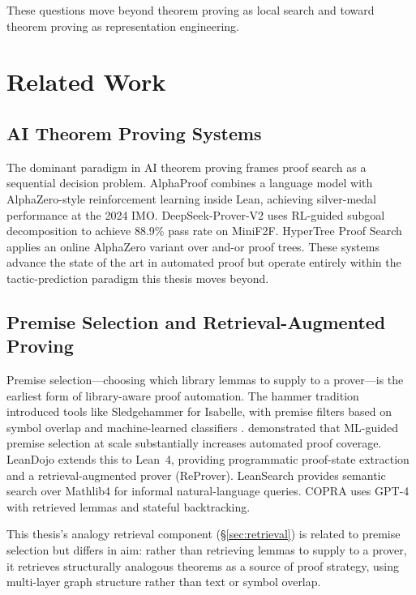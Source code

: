 \documentclass[12pt, a4paper]{article}
\begin{document}
These questions move beyond theorem proving as local search and toward
theorem proving as representation engineering.

\section{Related Work}

\subsection{AI Theorem Proving Systems}

The dominant paradigm in AI theorem proving frames proof search as a
sequential decision problem. AlphaProof \citep{alphaproof2025} combines a
language model with AlphaZero-style reinforcement learning inside Lean,
achieving silver-medal performance at the 2024 IMO. DeepSeek-Prover-V2
\citep{deepseekproverv2} uses RL-guided subgoal decomposition to achieve
88.9\% pass rate on MiniF2F. HyperTree Proof Search
\citep{lample2022hypertree} applies an online AlphaZero variant over and-or
proof trees. These systems advance the state of the art in automated proof
but operate entirely within the tactic-prediction paradigm this thesis moves
beyond.

\subsection{Premise Selection and Retrieval-Augmented Proving}

Premise selection---choosing which library lemmas to supply to a
prover---is the earliest form of library-aware proof automation. The hammer
tradition \citep{paulson2010sledgehammer, blanchette2016hammering} introduced
tools like Sledgehammer for Isabelle, with premise filters based on symbol
overlap \citep{meng2009mepo} and machine-learned classifiers
\citep{kuhlwein2013mash}. \citet{kaliszyk2014} demonstrated that ML-guided
premise selection at scale substantially increases automated proof coverage.
LeanDojo \citep{yang2023leandojo} extends this to Lean~4, providing
programmatic proof-state extraction and a retrieval-augmented prover
(ReProver). LeanSearch \citep{gao2024leansearch} provides semantic search
over Mathlib4 for informal natural-language queries. COPRA
\citep{thakur2023copra} uses GPT-4 with retrieved lemmas and stateful
backtracking.

This thesis's analogy retrieval component (\S\ref{sec:retrieval}) is related
to premise selection but differs in aim: rather than retrieving lemmas to
supply to a prover, it retrieves structurally analogous theorems as a source
of proof strategy, using multi-layer graph structure rather than text or
symbol overlap.
\end{document}
